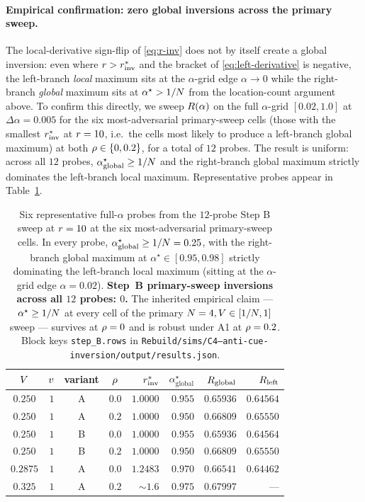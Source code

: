 \paragraph{Empirical confirmation: zero global inversions across the
primary sweep.}
The local-derivative sign-flip of \eqref{eq:r-inv} does not by
itself create a global inversion: even where $r > r^{*}_{\mathrm{inv}}$
and the bracket of \eqref{eq:left-derivative} is negative, the
left-branch \emph{local} maximum sits at the $\alpha$-grid edge
$\alpha \to 0$ while the right-branch \emph{global} maximum sits at
$\alpha^\star > 1/N$ from the location-count argument above. To
confirm this directly, we sweep $R(\alpha)$ on the full
$\alpha$-grid $[0.02, 1.0]$ at $\Delta\alpha = 0.005$ for the six
most-adversarial primary-sweep cells (those with the smallest
$r^{*}_{\mathrm{inv}}$ at $r = 10$, i.e.\ the cells most likely to produce
a left-branch global maximum) at both $\rho \in \{0, 0.2\}$, for a
total of $12$ probes. The result is uniform: across all $12$ probes,
$\alpha^\star_{\mathrm{global}} \ge 1/N$ and the right-branch
global maximum strictly dominates the left-branch local maximum.
Representative probes appear in Table~\ref{tab:c4-stepB}.
%
\begin{table}[t]
  \centering
  \small
  \begin{tabular}{c r c c r r r r}
    \toprule
    $V$ & $v$ & variant & $\rho$ &
    $r^{*}_{\mathrm{inv}}$ & $\alpha^\star_{\mathrm{global}}$ &
    $R_{\mathrm{global}}$ & $R_{\mathrm{left}}$ \\
    \midrule
    $0.250$ & $1$ & A & $0.0$ & $1.0000$ & $0.955$ &
    $0.65936$ & $0.64564$ \\
    $0.250$ & $1$ & A & $0.2$ & $1.0000$ & $0.950$ &
    $0.66809$ & $0.65550$ \\
    $0.250$ & $1$ & B & $0.0$ & $1.0000$ & $0.955$ &
    $0.65936$ & $0.64564$ \\
    $0.250$ & $1$ & B & $0.2$ & $1.0000$ & $0.950$ &
    $0.66809$ & $0.65550$ \\
    $0.2875$ & $1$ & A & $0.0$ & $1.2483$ & $0.970$ &
    $0.66541$ & $0.64462$ \\
    $0.325$ & $1$ & A & $0.2$ & $\sim\!1.6$ & $0.975$ &
    $0.67997$ & --- \\
    \bottomrule
  \end{tabular}
  \caption{Six representative full-$\alpha$ probes from the
  $12$-probe Step B sweep at $r = 10$ at the six
  most-adversarial primary-sweep cells. In every probe,
  $\alpha^\star_{\mathrm{global}} \ge 1/N = 0.25$, with the
  right-branch global maximum at $\alpha^\star \in [0.95, 0.98]$
  strictly dominating the left-branch local maximum (sitting at the
  $\alpha$-grid edge $\alpha = 0.02$). \textbf{Step~B primary-sweep
  inversions across all $12$ probes: $0$.} The inherited empirical
  claim --- $\alpha^\star \ge 1/N$ at every cell of the primary
  $N = 4, V \in [1/N, 1]$ sweep --- survives at
  $\rho = 0$ and is robust under A1 at $\rho = 0.2$.
  Block keys \texttt{step\_B.rows} in
  \texttt{Rebuild/sims/C4--anti-cue-inversion/output/results.json}.}
  \label{tab:c4-stepB}
\end{table}

